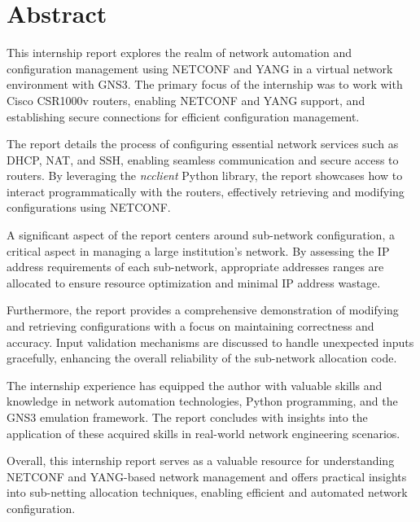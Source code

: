 \chapter{Abstract}

This internship report explores the realm of network automation and configuration management using \gls{NETCONF} and \gls{YANG} in a virtual network environment with \gls{GNS3}. The primary focus of the internship was to work with Cisco CSR1000v routers, enabling \gls{NETCONF} and \gls{YANG} support, and establishing secure connections for efficient configuration management.

The report details the process of configuring essential network services such as \gls{DHCP}, \gls{NAT}, and \gls{SSH}, enabling seamless communication and secure access to routers. By leveraging the \textit{ncclient} Python library, the report showcases how to interact programmatically with the routers, effectively retrieving and modifying configurations using \gls{NETCONF}.

A significant aspect of the report centers around sub-network configuration, a critical aspect in managing a large institution's network. By assessing the \gls{IP} address requirements of each sub-network, appropriate addresses ranges are allocated to ensure resource optimization and minimal \gls{IP} address wastage.

Furthermore, the report provides a comprehensive demonstration of modifying and retrieving configurations with a focus on maintaining correctness and accuracy. Input validation mechanisms are discussed to handle unexpected inputs gracefully, enhancing the overall reliability of the sub-network allocation code.

The internship experience has equipped the author with valuable skills and knowledge in network automation technologies, Python programming, and the \gls{GNS3} emulation framework. The report concludes with insights into the application of these acquired skills in real-world network engineering scenarios.

Overall, this internship report serves as a valuable resource for understanding \gls{NETCONF} and \gls{YANG}-based network management and offers practical insights into sub-netting allocation techniques, enabling efficient and automated network configuration.


